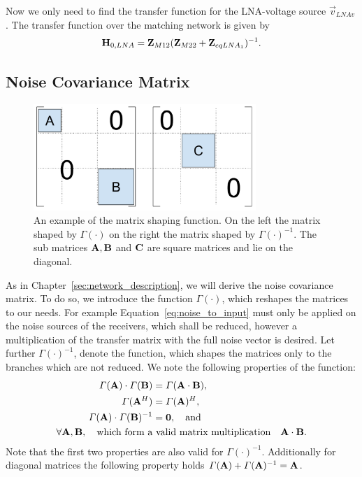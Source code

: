 Now we only need to find the transfer function for the LNA-voltage source $\vec{v}_{LNAv}$.
The transfer function over the matching network is given by
\begin{align}
\label{eq:noise_to_input}
\mathbf{H}_{0,LNA} = \mathbf{Z}_{M12}(\mathbf{Z}_{M22}+\mathbf{Z}_{eqLNA_1})^{-1}.
\end{align}




\subsection{Noise Covariance Matrix}
\label{sec:sig_cov}

\begin{figure}[h]
\begin{center}
\includegraphics[width=0.75\textwidth]{images/matrix_shaping.png}
\caption{An example of the matrix shaping function. On the left the matrix shaped by $\Gamma(\cdot)$ on the right the matrix shaped by $\Gamma(\cdot)^{-1}$. The sub matrices $\mathbf{A},\mathbf{B}$ and $\mathbf{C}$ are square matrices and lie on the diagonal.}
\label{fig:matrix_shaping}
\end{center}
\end{figure}

As in Chapter~\ref{sec:network_description}, we will derive the noise covariance matrix.
To do so, we introduce the function $\Gamma(\cdot)$, which reshapes the matrices to our needs.
For example Equation~\eqref{eq:noise_to_input} must only be applied on the noise sources of the receivers, which shall be reduced, however a multiplication of the transfer matrix with the full noise vector is desired.
Let further $\Gamma(\cdot)^{-1}$, denote the function, which shapes the matrices only to the branches which are not reduced.
We note the following properties of the function:
\begin{align}
\label{eq:gamma_properties}\nonumber
\Gamma(\mathbf{A})\cdot\Gamma(\mathbf{B}) &= \Gamma(\mathbf{A}\cdot\mathbf{B}),\\\nonumber
\Gamma(\mathbf{A}^{H}) &= \Gamma(\mathbf{A})^{H},\\\nonumber
\Gamma(\mathbf{A})\cdot\Gamma(\mathbf{B})^{-1} &= \mathbf{0},\quad\text{and}\\
\forall \mathbf{A},\mathbf{B},\quad\text{which form a}&\text{ valid matrix multiplication}\quad\mathbf{A}\cdot\mathbf{B}.
\end{align}
Note that the first two properties are also valid for $\Gamma(\cdot)^{-1}$.
Additionally for diagonal matrices the following property holds $\Gamma(\mathbf{A})+\Gamma(\mathbf{A})^{-1} = \mathbf{A}$.

